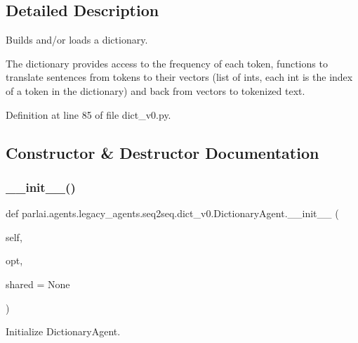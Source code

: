 \subsection{Detailed Description}
\begin{DoxyVerb}Builds and/or loads a dictionary.

The dictionary provides access to the frequency of each token, functions
to translate sentences from tokens to their vectors (list of ints, each
int is the index of a token in the dictionary) and back from vectors to
tokenized text.
\end{DoxyVerb}
 

Definition at line 85 of file dict\+\_\+v0.\+py.



\subsection{Constructor \& Destructor Documentation}
\mbox{\label{classparlai_1_1agents_1_1legacy__agents_1_1seq2seq_1_1dict__v0_1_1DictionaryAgent_ace91e7215f1a4688abaa3235e2c19d56}} 
\subsubsection{\texorpdfstring{\+\_\+\+\_\+init\+\_\+\+\_\+()}{\_\_init\_\_()}}
{\footnotesize\ttfamily def parlai.\+agents.\+legacy\+\_\+agents.\+seq2seq.\+dict\+\_\+v0.\+Dictionary\+Agent.\+\_\+\+\_\+init\+\_\+\+\_\+ (\begin{DoxyParamCaption}\item[{}]{self,  }\item[{}]{opt,  }\item[{}]{shared = {\ttfamily None} }\end{DoxyParamCaption})}

\begin{DoxyVerb}Initialize DictionaryAgent.\end{DoxyVerb}
 


